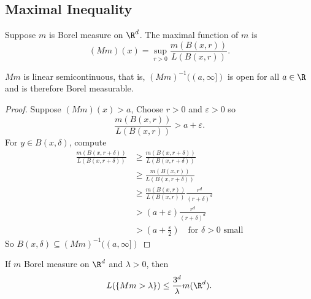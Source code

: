 \subsection{Maximal Inequality}

\begin{definition}
  Suppose $m$ is Borel measure on $\R^d$. The maximal function of $m$ is
  \[
    (Mm)(x) = \sup_{r > 0} \frac{m(B(x,r))}{L(B(x,r))}.
  \]
\end{definition}

\begin{lemma}
  $Mm$ is linear semicontinuous, that is, $(Mm)^{-1} ((a, \infty])$ is open for all $a \in \R$ and is therefore Borel measurable.
\end{lemma}

\begin{proof}
  Suppose $(Mm)(x) > a$,
  Choose $r > 0$ and $\varepsilon > 0$ so
  \[
    \frac{m(B(x,r))}{L(B(x,r))} > a + \varepsilon.
  \]
  For $y \in B(x, \delta)$, compute
  \begin{align*}
    \frac{m(B(x,r+\delta))}{L(B(x,r+\delta))} & \geq \frac{m(B(x,r+\delta))}{L(B(x,r+\delta))} \\
                                              & \geq \frac{m(B(x,r))}{L(B(x,r+\delta))} \\
                                              & \geq \frac{m(B(x,r))}{L(B(x,r))} \frac{r^d}{(r + \delta)^d} \\
                                              & > (a + \varepsilon) \frac{r^d}{(r + \delta)^d} \\
                                              & > \left(a + \frac{\varepsilon}{2}\right) \quad \textrm{for $\delta > 0$ small}
  \end{align*}
  So $B(x, \delta) \subseteq (Mm)^{-1}((a, \infty])$
\end{proof}


\begin{theorem}
  If $m$ Borel measure on $\R^d$ and $\lambda > 0$, then
  \[
    L(\{Mm > \lambda\}) \leq \frac{3^d}{\lambda} m(\R^d).
  \]
\end{theorem}


